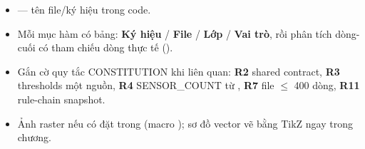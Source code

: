 \begin{itemize}
\item {} — tên file/ký hiệu trong code.
\item Mỗi mục hàm có bảng: \textbf{Ký hiệu} / \textbf{File} / \textbf{Lớp} /
\textbf{Vai trò}, rồi phân tích dòng-cuối có tham chiếu dòng thực tế
().
\item Gắn cờ quy tắc CONSTITUTION khi liên quan: \textbf{R2} shared contract,
\textbf{R3} thresholds một nguồn, \textbf{R4} SENSOR\_COUNT từ
, \textbf{R7} file $\le$ 400 dòng, \textbf{R11} rule-chain
snapshot.
\item Ảnh raster nếu có đặt trong  (macro
); sơ đồ vector vẽ bằng TikZ ngay trong chương.
\end{itemize}